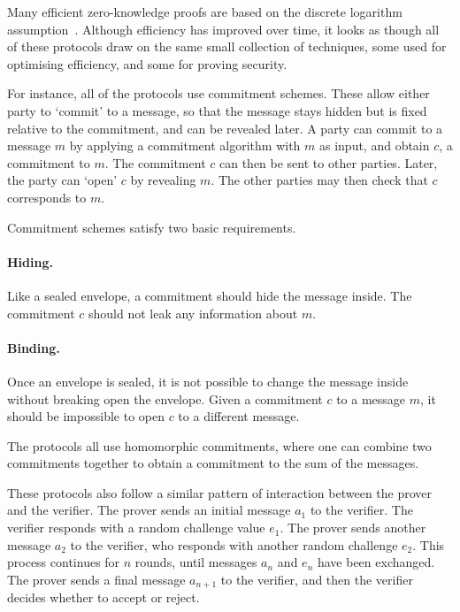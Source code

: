 Many efficient zero-knowledge proofs are based on the discrete logarithm assumption~\cite{Schnorr91,Cramer1998a,Groth2009b,Seo2011a,BootleCCGP16,BunzBBPWM18,GrothK15,BootleCCGGP15,BayerG13,BootleG18}. Although efficiency has improved over time, it looks as though all of these protocols draw on the same small collection of techniques, some used for optimising efficiency, and some for proving security.

For instance, all of the protocols use commitment schemes. These allow either party to `commit' to a message, so that the message stays hidden but is fixed relative to the commitment, and can be revealed later. A party can commit to a message $m$ by applying a commitment algorithm with $m$ as input, and obtain $c$, a commitment to $m$. The commitment $c$ can then be sent to other parties. Later, the party can `open' $c$ by revealing $m$. The other parties may then check that $c$ corresponds to $m$.

Commitment schemes satisfy two basic requirements.

\paragraph{Hiding.} Like a sealed envelope, a commitment should hide the message inside. The commitment $c$ should not leak any information about $m$.

\paragraph{Binding.} Once an envelope is sealed, it is not possible to change the message inside without breaking open the envelope. Given a commitment $c$ to a message $m$, it should be impossible to open $c$ to a different message.

The protocols all use homomorphic commitments, where one can combine two commitments together to obtain a commitment to the sum of the messages.

These protocols also follow a similar pattern of interaction between the prover and the verifier. The prover sends an initial message $a_1$ to the verifier. The verifier responds with a random challenge value $e_1$. The prover sends another message $a_2$ to the verifier, who responds with another random challenge $e_2$. This process continues for $n$ rounds, until messages $a_n$ and $e_n$ have been exchanged. The prover sends a final message $a_{n+1}$ to the verifier, and then the verifier decides whether to accept or reject.

